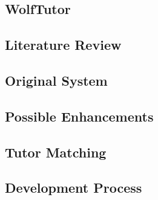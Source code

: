 \subsection{WolfTutor}
\label{sec:wolftutor}


\subsection{Literature Review}
\label{sec:literature-review}


\subsection{Original System}
\label{sec:original_system}


\subsection{Possible Enhancements}
 

\subsection{Tutor Matching}
\label{sec:tutor-matching}


\subsection{Development Process}
\label{sec:development-process}





